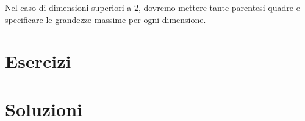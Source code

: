 \documentclass[oneside]{scrbook}
\begin{document}
Nel caso di dimensioni superiori a $2$, dovremo mettere tante parentesi quadre e specificare le grandezze massime per ogni dimensione.
		
\section{Esercizi}






% 









\clearpage
\section*{Soluzioni}
\shipoutAnswer
\end{document}
